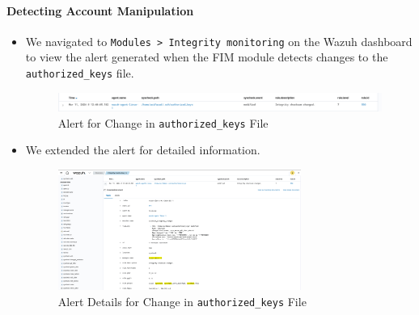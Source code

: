 \paragraph{Detecting Account Manipulation}
\begin{itemize}
    \item We navigated to \texttt{Modules > Integrity monitoring} on the Wazuh dashboard to view the alert generated when the FIM module detects changes to the \texttt{authorized\_keys} file.
          \begin{figure} [H]
              \centering
              \includegraphics[width=\textwidth]{images/fim/fim-11.png}
              \caption{Alert for Change in \texttt{authorized\_keys} File}
              \label{fig:fim-11}
          \end{figure}
    \item We extended the alert for detailed information.
          \begin{figure} [H]
              \centering
              \includegraphics[width=0.75\textwidth]{images/fim/fim-12.png}
              \caption{Alert Details for Change in \texttt{authorized\_keys} File}
              \label{fig:fim-12}
          \end{figure}

\end{itemize}

